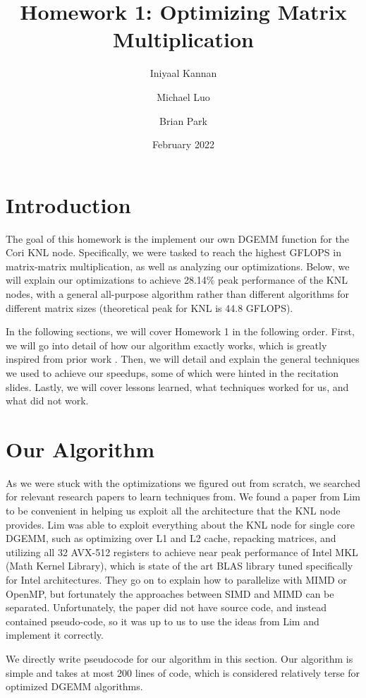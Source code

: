\documentclass{article}
\title{Homework 1: Optimizing Matrix Multiplication}
\author{Iniyaal Kannan}
\author{Michael Luo}
\author{Brian Park}
\date{February 2022}
\affil{UC Berkeley, Computer Science 267}
\begin{document}
\maketitle

\section{Introduction}
The goal of this homework is the implement our own DGEMM function for the Cori KNL node. Specifically, we were tasked to reach the highest GFLOPS in matrix-matrix multiplication, as well as analyzing our optimizations. Below, we will explain our optimizations to achieve 28.14\% peak performance of the KNL nodes, with a general all-purpose algorithm rather than different algorithms for different matrix sizes (theoretical peak for KNL is 44.8 GFLOPS).

In the following sections, we will cover Homework 1 in the following order. First, we will go into detail of how our algorithm exactly works, which is greatly inspired from prior work \cite{10.1007/s10586-018-2810-y}. Then, we will detail and explain the general techniques we used to achieve our speedups, some of which were hinted in the recitation slides. Lastly, we will cover lessons learned, what techniques worked for us, and what did not work.

\section{Our Algorithm}
As we were stuck with the optimizations we figured out from scratch, we searched for relevant research papers to learn techniques from. We found a paper from Lim \cite{10.1007/s10586-018-2810-y} to be convenient in helping us exploit all the architecture that the KNL node provides. Lim was able to exploit everything about the KNL node for single core DGEMM, such as optimizing over L1 and L2 cache, repacking matrices, and utilizing all 32 AVX-512 registers to achieve near peak performance of Intel MKL (Math Kernel Library), which is state of the art BLAS library tuned specifically for Intel architectures. They go on to explain how to parallelize with MIMD or OpenMP, but fortunately the approaches between SIMD and MIMD can be separated. Unfortunately, the paper did not have source code, and instead contained pseudo-code, so it was up to us to use the ideas from Lim and implement it correctly. 

We directly write pseudocode for our algorithm in this section. Our algorithm is simple and takes at most 200 lines of code, which is considered relatively terse for optimized DGEMM algorithms.
\end{document}
